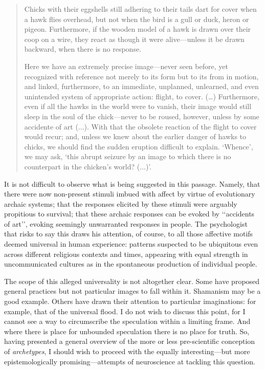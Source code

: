 \documentclass[a4paper]{article}
\begin{document}
    \begin{quote}
        Chicks with their eggshells still adhering to their tails dart for
        cover when a hawk flies overhead, but not when the bird is a gull or
        duck, heron or pigeon. Furthermore, if the wooden model of a hawk is
        drawn over their coop on a wire, they react as though it were
        alive---unless it be drawn backward, when there is no response.

        Here we have an extremely precise image---never seen before, yet
        recognized with reference not merely to its form but to its from in
        motion, and linked, furthermore, to an immediate, unplanned, unlearned,
        and even unintended system of appropriate action: flight, to cover.
        (\ldots) Furthermore, even if all the hawks in the world were to
        vanish, their image would still sleep in the soul of the chick---never
        to be roused, however, unless by some accidente of art ($\ldots$). With
        that the obsolete reaction of the flight to cover would recur; and,
        unless we knew about the earlier danger of hawks to chicks, we should
        find the sudden eruption difficult to explain. \lq Whence\rq, we may
        ask, \lq this abrupt seizure by an image to which there is no
        counterpart in the chicken's world? ($\ldots$)\rq.
    \end{quote}

    It is not difficult to observe what is being suggested in this passage.
    Namely, that there were now non-present stimuli imbued with affect by
    virtue of evolutionary archaic systems; that the responses elicited by
    these stimuli were arguably propitious to survival; that these archaic
    responses can be evoked by \lq\lq accidents of art\rq\rq, evoking seemingly
    unwarranted responses in people. The psychologist that risks to say this
    draws his attention, of course, to all those affective motifs deemed
    universal in human experience: patterns suspected to be ubiquitous even
    across different religious contexts and times, appearing with equal
    strength in uncommunicated cultures as in the spontaneous production of
    individual people. 

    The scope of this alleged universality is not altogether clear. Some have
    proposed general practices but not particular images to fall within it.
    Shamanism may be a good example. Others have drawn their attention to
    particular imaginations: for example, that of the universal flood. I do not
    wish to discuss this point, for I cannot see a way to circumscribe the
    speculation within a limiting frame. And where there is place for unbounded
    speculation there is no place for truth. So, having presented a general
    overview of the more or less pre-scientific conception of
    \textit{archetypes}, I should wish to proceed with the equally
    interesting---but more epistemologically promising---attempts of
    neuroscience at tackling this question.
\end{document}
